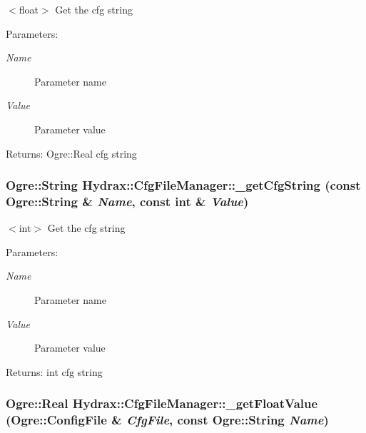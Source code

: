 $<$float$>$ Get the cfg string \begin{Desc}
\item[Parameters:]
\begin{description}
\item[{\em Name}]Parameter name \item[{\em Value}]Parameter value \end{description}
\end{Desc}
\begin{Desc}
\item[Returns:]Ogre::Real cfg string \end{Desc}
\hypertarget{class_hydrax_1_1_cfg_file_manager_020c0d58713f7ecbd396101247bcab1b}{
\subsubsection[{\_\-getCfgString}]{\setlength{\rightskip}{0pt plus 5cm}Ogre::String Hydrax::CfgFileManager::\_\-getCfgString (const Ogre::String \& {\em Name}, \/  const int \& {\em Value})}}
\label{class_hydrax_1_1_cfg_file_manager_020c0d58713f7ecbd396101247bcab1b}


$<$int$>$ Get the cfg string \begin{Desc}
\item[Parameters:]
\begin{description}
\item[{\em Name}]Parameter name \item[{\em Value}]Parameter value \end{description}
\end{Desc}
\begin{Desc}
\item[Returns:]int cfg string \end{Desc}
\hypertarget{class_hydrax_1_1_cfg_file_manager_6d5259e0ccd2bd730310c7229c16eecb}{
\subsubsection[{\_\-getFloatValue}]{\setlength{\rightskip}{0pt plus 5cm}Ogre::Real Hydrax::CfgFileManager::\_\-getFloatValue (Ogre::ConfigFile \& {\em CfgFile}, \/  const Ogre::String {\em Name})}}
\label{class_hydrax_1_1_cfg_file_manager_6d5259e0ccd2bd730310c7229c16eecb}



